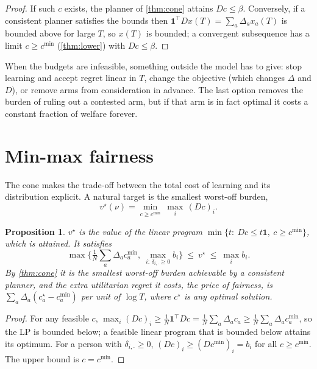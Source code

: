 \documentclass[11pt,a4paper]{article}
\theoremstyle{plain}
\newtheorem{proposition}[theorem]{Proposition}
\theoremstyle{definition}
\theoremstyle{remark}
\newcommand{\cmin}{c^{\min}}
\begin{document}
\begin{proof}
If such $c$ exists, the planner of \cref{thm:cone} attains $Dc\le\beta$. Conversely, if a consistent planner satisfies the bounds then $\mathbf 1^\top Dx(T)=\sum_a\Delta_ax_a(T)$ is bounded above for large $T$, so $x(T)$ is bounded; a convergent subsequence has a limit $c\ge\cmin$ (\cref{thm:lower}) with $Dc\le\beta$.
\end{proof}

When the budgets are infeasible, something outside the model has to give: stop learning and accept regret linear in $T$, change the objective (which changes $\Delta$ and $D$), or remove arms from consideration in advance. The last option removes the burden of ruling out a contested arm, but if that arm is in fact optimal it costs a constant fraction of welfare forever.

\section{Min-max fairness}\label{sec:fair}

The cone makes the trade-off between the total cost of learning and its distribution explicit. A natural target is the smallest worst-off burden,
\[
  v^\star(\nu)=\min_{c\ge\cmin}\ \max_i\,(Dc)_i .
\]

\begin{proposition}\label{prop:lp}
$v^\star$ is the value of the linear program $\min\{t:\ Dc\le t\mathbf 1,\ c\ge\cmin\}$, which is attained. It satisfies
\[
  \max\Big\{\tfrac1N\textstyle\sum_a\Delta_a\cmin_a,\ \max_{i:\,\delta_{i,\cdot}\ge0}b_i\Big\}\ \le\ v^\star\ \le\ \max_ib_i .
\]
By \cref{thm:cone} it is the smallest worst-off burden achievable by a consistent planner, and the extra utilitarian regret it costs, the \emph{price of fairness}, is $\sum_a\Delta_a(c^\star_a-\cmin_a)$ per unit of $\log T$, where $c^\star$ is any optimal solution.
\end{proposition}

\begin{proof}
For any feasible $c$, $\max_i(Dc)_i\ge\frac1N\mathbf 1^\top Dc=\frac1N\sum_a\Delta_ac_a\ge\frac1N\sum_a\Delta_a\cmin_a$, so the LP is bounded below; a feasible linear program that is bounded below attains its optimum. For a person with $\delta_{i,\cdot}\ge0$, $(Dc)_i\ge(D\cmin)_i=b_i$ for all $c\ge\cmin$. The upper bound is $c=\cmin$.
\end{proof}
\end{document}
